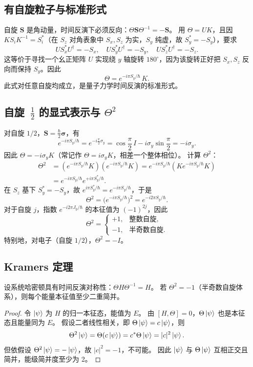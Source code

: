 \subsection{有自旋粒子与标准形式}
自旋 $\mathbf{S}$ 是角动量，时间反演下必须反向：$\Theta \mathbf{S}\Theta^{-1} = -\mathbf{S}$。  
用 $\Theta = UK$，且因 $K S_i K^{-1} = S_i^*$（在 $S_z$ 对角表象中 $S_x,S_z$ 为实，$S_y$ 纯虚，故 $S_y^*=-S_y$），要求
\[
U S_x^* U^\dagger = -S_x,\quad U S_y^* U^\dagger = -S_y,\quad U S_z^* U^\dagger = -S_z.
\]
这等价于寻找一个幺正矩阵 $U$ 实现绕 $y$ 轴旋转 $180^\circ$，因为该旋转正好把 $S_x,S_z$ 反向而保持 $S_y$。因此
\[
{\Theta = e^{-i\pi S_y/\hbar}\,K}.
\]
此式对任意自旋均成立，是量子力学时间反演的标准形式。

\subsection{自旋~$\frac{1}{2}$ 的显式表示与 $\Theta^2$}
对自旋 $1/2$，$\mathbf{S}=\frac{\hbar}{2}\boldsymbol{\sigma}$，有
\[
e^{-i\pi S_y/\hbar} = e^{-i\frac{\pi}{2}\sigma_y} = \cos\frac{\pi}{2}\,I - i\sigma_y\sin\frac{\pi}{2} = -i\sigma_y.
\]
因此 $\Theta = -i\sigma_y K$（常记作 $\Theta = i\sigma_y K$，相差一个整体相位）。
计算 $\Theta^2$：
\begin{align*}
\Theta^2 &= (e^{-i\pi S_y/\hbar}K)(e^{-i\pi S_y/\hbar}K) = e^{-i\pi S_y/\hbar} (K e^{-i\pi S_y/\hbar} K) \\
&= e^{-i\pi S_y/\hbar} e^{+i\pi S_y^*/\hbar}.
\end{align*}
在 $S_z$ 基下 $S_y^* = -S_y$，故 $e^{i\pi S_y^*/\hbar} = e^{-i\pi S_y/\hbar}$，于是
\[
\Theta^2 = \bigl(e^{-i\pi S_y/\hbar}\bigr)^2 = e^{-i2\pi S_y/\hbar}.
\]
对于自旋 $j$，指数 $e^{-i2\pi J_y/\hbar}$ 的本征值为 $(-1)^{2j}$，因此
\[
{\Theta^2 = \begin{cases}
+1, & \text{整数自旋},\\
-1, & \text{半奇数自旋}.
\end{cases}}
\]
特别地，对电子（自旋 $1/2$），$\Theta^2 = -I$。

\subsection{Kramers 定理}
设系统哈密顿具有时间反演对称性：$\Theta H \Theta^{-1} = H$。
若 $\Theta^2 = -1$（半奇数自旋体系），则每个能量本征值至少二重简并。
\begin{proof}
令 $\ket{\psi}$ 为 $H$ 的归一本征态，能值为 $E$。
由 $[H,\Theta]=0$，$\Theta\ket{\psi}$ 也是本征态且能量同为 $E$。
假设二者线性相关，即 $\Theta\ket{\psi}=c\ket{\psi}$，则
\[
\Theta^2\ket{\psi} = \Theta(c\ket{\psi}) = c^*\Theta\ket{\psi} = |c|^2\ket{\psi}.
\]
但依假设 $\Theta^2\ket{\psi} = -\ket{\psi}$，故 $|c|^2 = -1$，不可能。
因此 $\ket{\psi}$ 与 $\Theta\ket{\psi}$ 互相正交且简并，能级简并度至少为 2。
\end{proof}

